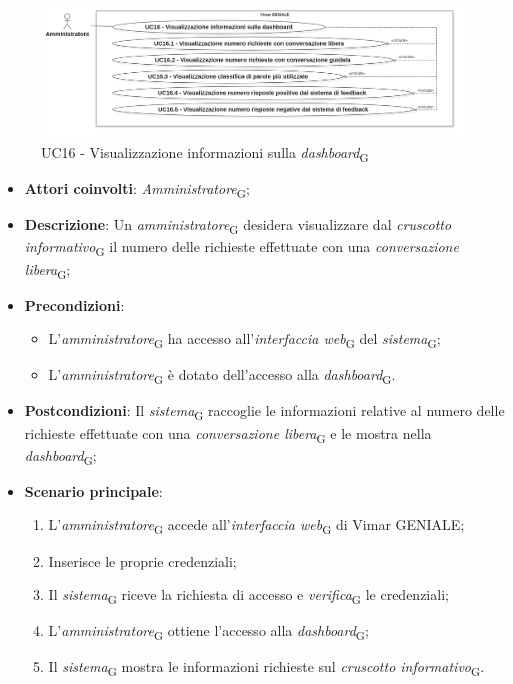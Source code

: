 \begin{figure}[H]
\centering
\includegraphics[width=1\textwidth]{contents/casi_duso/png/UC16.png}
\caption{UC16 - Visualizzazione informazioni sulla \textit{dashboard}\textsubscript{G}}
\end{figure}

\begin{itemize}
    \item \textbf{Attori coinvolti}: \textit{Amministratore}\textsubscript{G};
    \item \textbf{Descrizione}: Un \textit{amministratore}\textsubscript{G} desidera visualizzare dal \textit{cruscotto informativo}\textsubscript{G} il numero delle richieste effettuate con una \textit{conversazione libera}\textsubscript{G};
    \item \textbf{Precondizioni}: 
    \begin{itemize}
        \item L’\textit{amministratore}\textsubscript{G} ha accesso all’\textit{interfaccia web}\textsubscript{G} del \textit{sistema}\textsubscript{G};
        \item L’\textit{amministratore}\textsubscript{G} è dotato dell’accesso alla \textit{dashboard}\textsubscript{G}.
    \end{itemize}
    \item \textbf{Postcondizioni}: Il \textit{sistema}\textsubscript{G} raccoglie le informazioni relative al numero delle richieste effettuate con una \textit{conversazione libera}\textsubscript{G} e le mostra nella \textit{dashboard}\textsubscript{G};
    \item \textbf{Scenario principale}:
    \begin{enumerate}
        \item L’\textit{amministratore}\textsubscript{G} accede all’\textit{interfaccia web}\textsubscript{G} di Vimar GENIALE;
        \item Inserisce le proprie credenziali;
        \item Il \textit{sistema}\textsubscript{G} riceve la richiesta di accesso e \textit{verifica}\textsubscript{G} le credenziali;
        \item L’\textit{amministratore}\textsubscript{G} ottiene l’accesso alla \textit{dashboard}\textsubscript{G};
        \item Il \textit{sistema}\textsubscript{G} mostra le informazioni richieste sul \textit{cruscotto informativo}\textsubscript{G}.
    \end{enumerate}
\end{itemize}

